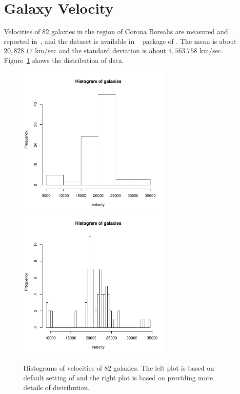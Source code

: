 \section[Galaxy Velocity]{Galaxy Velocity}
\label{sec:galaxy}

Velocities of 82 galaxies in the region of Corona Borealis are
measured and reported in~\citep{Roeder1990}, and the  dataset is
available in ~ package of .
The mean is about $20,828.17$ km/sec and the standard deviation is about
$4,563.758$ km/sec. Figure~\ref{fig:galaxy} shows the distribution of data.
\begin{figure}[ht]
\centering
  \includegraphics[width=3.0in]{pbdDEMO-include/pics/galaxy_1}
  \includegraphics[width=3.0in]{pbdDEMO-include/pics/galaxy_2}
\caption{Histograms of velocities of 82 galaxies. The left plot is based on
default setting of  and the right plot is based on
 providing more details of distribution.}
\label{fig:galaxy}
\end{figure}

